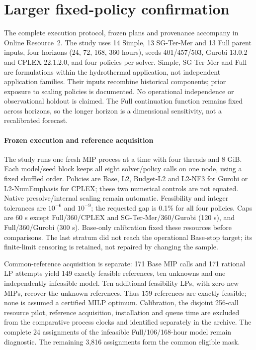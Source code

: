 \section{Larger fixed-policy confirmation}
\label{sec:orf-large-confirmation}
The complete execution protocol, frozen plans and provenance accompany
 in Online Resource~2. The study
uses 14 Simple, 13 SG-Ter-Mer and 13 Full parent inputs, four horizons
(24, 72, 168, 360 hours), seeds 401/457/503, Gurobi 13.0.2 and CPLEX 22.1.2.0,
and four policies per solver. Simple, SG-Ter-Mer and Full are formulations
within the hydrothermal application, not independent application families.
Their inputs recombine historical components; prior exposure to scaling
policies is documented. No operational independence or observational holdout
is claimed. The Full continuation function remains fixed across horizons,
so the longer horizon is a dimensional sensitivity, not a recalibrated forecast.

\paragraph{Frozen execution and reference acquisition}
The study runs one fresh MIP process at a time with four threads and 8 GiB.
Each model/seed block keeps all eight solver/policy calls on one node, using a
fixed shuffled order. Policies are Base, L2, Budget-L2 and L2-NF3 for Gurobi or
L2-NumEmphasis for CPLEX; these two numerical controls are not equated. Native
presolve/internal scaling remain automatic. Feasibility and integer tolerances
are $10^{-6}$ and $10^{-9}$; the requested gap is 0.1\% for all four policies.
Caps are 60 s except Full/360/CPLEX and SG-Ter-Mer/360/Gurobi (120 s), and
Full/360/Gurobi (300 s). Base-only calibration fixed these resources before
comparisons. The last stratum did not reach the operational Base-stop target;
its finite-limit censoring is retained, not repaired by changing the sample.

Common-reference acquisition is separate: 171 Base MIP calls and 171 rational
LP attempts yield 149 exactly feasible references, ten unknowns and one
independently infeasible model. Ten additional feasibility LPs, with zero new
MIPs, recover the unknown references. Thus 159 references are exactly feasible;
none is assumed a certified MILP optimum. Calibration, the disjoint 256-call
resource pilot, reference acquisition, installation and queue time are excluded
from the comparative process clocks and identified separately in the archive.
The complete 24 assignments of the infeasible Full/106/168-hour model remain
diagnostic. The remaining 3,816 assignments form the common eligible mask.

